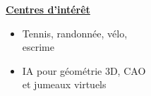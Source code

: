 \documentclass[letterpaper,10pt]{article}
\begin{document}
\begin{minipage}[t]{0.28\textwidth}
  \raggedright
  \textbf{\underline{Centres d'intérêt}}\\[-2pt]
  {\scriptsize
    \begin{itemize}[leftmargin=*,itemsep=1pt,parsep=0pt,topsep=0pt,partopsep=0pt]
      \item Tennis, randonnée, vélo, \\escrime
      \item IA pour géométrie 3D, CAO \\et jumeaux virtuels
    \end{itemize}
  }
\end{minipage}



\end{document}
